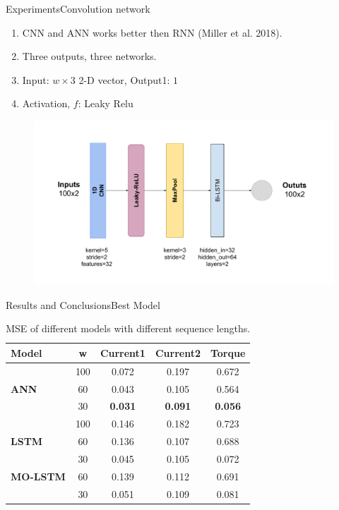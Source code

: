 \documentclass[handout]{beamer}
\begin{document}
\begin{frame}{Experiments}{Convolution network}
  \begin{enumerate}
    \item CNN and ANN works better then RNN (Miller et al. 2018).
    \item Three outputs, three networks.
    \item Input: $w\times3$ 2-D vector, Output1: $1$
    \item Activation, $f$: Leaky Relu
  \end{enumerate}
  \begin{center}
    \begin{figure}
    \includegraphics[scale=0.35]{images/motor_cnn}
    \end{figure}
  \end{center}
\end{frame}


\begin{frame}{Results and Conclusions}{Best Model}
\begin{table}[]
  \begin{tabular}{l c c c c}
  \toprule[0.2mm]
   \textbf{Model} & \textbf{w} & \textbf{Current1} & \textbf{Current2} & \textbf{Torque}\\
   \midrule
   & 100 & 0.072 & 0.197 & 0.672 \\
   \textbf{ANN} & 60 & 0.043 & 0.105 & 0.564 \\
   & 30 & \textbf{0.031} & \textbf{0.091} & \textbf{0.056} \\
   \midrule
   & 100 & 0.146 & 0.182 & 0.723 \\
   \textbf{LSTM} & 60 & 0.136 & 0.107 & 0.688 \\
   & 30 & 0.045 & 0.105 & 0.072 \\
   \midrule
   \textbf{MO-LSTM} & 60 & 0.139 & 0.112 & 0.691 \\
   & 30 & 0.051 & 0.109 & 0.081 \\
   \bottomrule
  \end{tabular}
  \caption{MSE of different models with different sequence lengths.}
  \end{table}
\end{frame}
%
\end{document}
